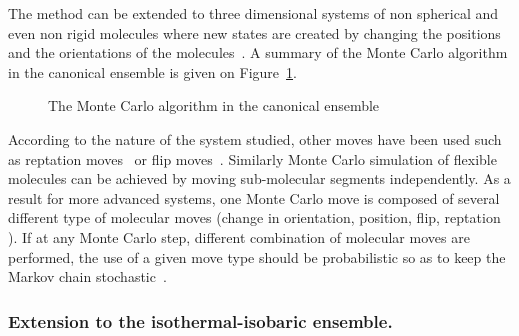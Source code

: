 The method can be extended to three dimensional systems of non spherical and even non rigid
molecules where new states are created by changing the positions and the orientations of the
molecules~\cite{AandT}. A summary of the Monte Carlo algorithm in the canonical ensemble is
given on Figure~\ref{fig:MCalgo}.

\begin{figure}
\centering
{}
\caption{The Monte Carlo algorithm in the canonical ensemble}
\label{fig:MCalgo}
\end{figure}

According to the nature of the system studied, other moves have been
used such as reptation moves~\cite{WilliamsonJackson98} or flip moves~\cite{BerardiRicci01}.
Similarly Monte Carlo simulation of flexible molecules can be achieved by moving sub-molecular
segments independently. As a result for more advanced systems, one Monte Carlo move is composed
of several different type of molecular moves (change in orientation, position, flip, reptation
\etc). If at any Monte Carlo step, different combination of molecular moves are performed, the
use of a given move type should be probabilistic so as to keep the Markov chain 
stochastic~\cite{AandT}.\\


\subsubsection{Extension to the isothermal-isobaric ensemble.}

